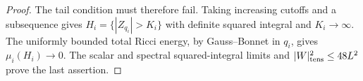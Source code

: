 \begin{proof}
The tail condition must therefore fail. Taking increasing cutoffs
and a subsequence gives \(H_i=\{|Z_{q_i}|>K_i\}\) with definite
squared integral and \(K_i\to\infty\). The uniformly bounded total
Ricci energy, by Gauss--Bonnet in \(q_i\), gives \(\mu_i(H_i)\to0\).
The scalar and spectral squared-integral limits and
\(|W|_{\rm tens}^2\le48L^2\) prove the last assertion.
\end{proof}
